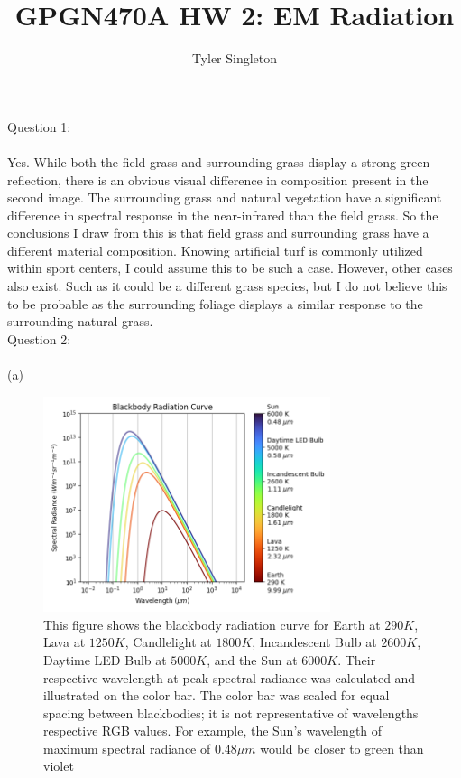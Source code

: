 \documentclass{homework}
\title{GPGN470A HW 2: EM Radiation}
\author{Tyler Singleton}
\begin{document}
\maketitle

Question 1: \\ \\
Yes. While both the field grass and surrounding grass display a strong green reflection, there is an obvious visual difference in composition present in the second image. The surrounding grass and natural vegetation have a significant difference in spectral response in the near-infrared than the field grass. So the conclusions I draw from this is that field grass and surrounding grass have a different material composition. Knowing artificial turf is commonly utilized within sport centers, I could assume this to be such a case. However, other cases also exist. Such as it could be a  different grass species, but I do not believe this to be probable as the surrounding foliage displays a similar response to the surrounding natural grass. \\


Question 2: \\ \\
(a)
\begin{figure}[h]
    \centering
    \includegraphics[width=0.75\textwidth]{Blackbody_Curve.png}
    \caption{This figure shows the blackbody radiation curve for Earth at $290 K$, Lava at $1250 K$, Candlelight at $1800 K$, Incandescent Bulb at $2600 K$, Daytime LED Bulb at $5000 K$, and the Sun at $6000 K$. Their respective wavelength at peak spectral radiance was calculated and illustrated on the color bar. The color bar was scaled for equal spacing between blackbodies; it is not representative of wavelengths respective RGB values. For example, the Sun's wavelength of maximum spectral radiance of $0.48 \mu m$ would be closer to green than violet}
    \label{fig:blackbody}
\end{figure}
\end{document}
